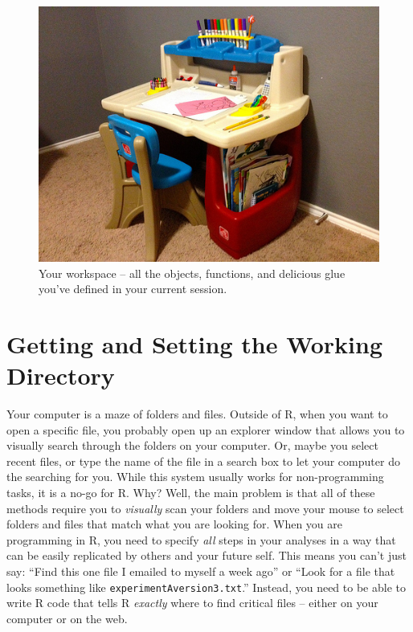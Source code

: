 \documentclass[
]{book}
\begin{document}
\begin{figure}

{\centering \includegraphics[width=0.75\linewidth]{images/chapter-3/workspace} 

}

\caption{Your workspace -- all the objects, functions, and delicious glue you've defined in your current session.}\label{fig:workspace}
\end{figure}

\hypertarget{NAVIGATE-WORKING-DIRECTORY}{%
\section{Getting and Setting the Working Directory}\label{NAVIGATE-WORKING-DIRECTORY}}

Your computer is a maze of folders and files. Outside of R, when you want to open a specific file, you probably open up an explorer window that allows you to visually search through the folders on your computer. Or, maybe you select recent files, or type the name of the file in a search box to let your computer do the searching for you. While this system usually works for non-programming tasks, it is a no-go for R. Why? Well, the main problem is that all of these methods require you to \emph{visually} scan your folders and move your mouse to select folders and files that match what you are looking for. When you are programming in R, you need to specify \emph{all} steps in your analyses in a way that can be easily replicated by others and your future self. This means you can't just say: ``Find this one file I emailed to myself a week ago'' or ``Look for a file that looks something like \texttt{experimentAversion3.txt}.'' Instead, you need to be able to write R code that tells R \emph{exactly} where to find critical files -- either on your computer or on the web.
\end{document}
